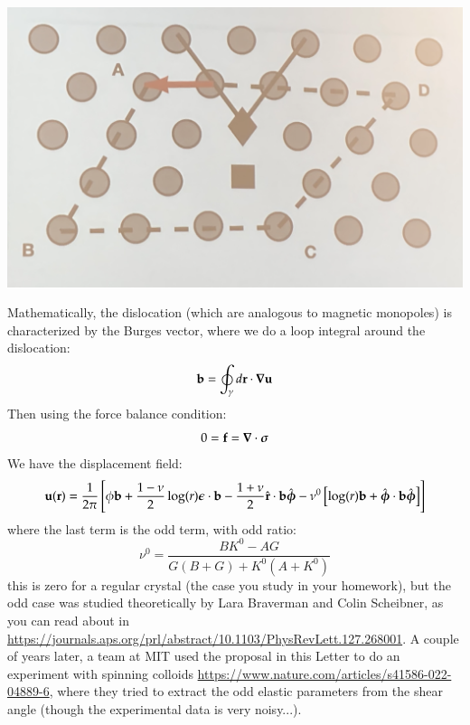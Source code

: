 \begin{center}
    \includegraphics[scale=0.3]{Lectures/Images/lec7-dislocationatoms.png}
\end{center}
Mathematically, the dislocation (which are analogous to magnetic monopoles) is characterized by the Burges vector, where we do a loop integral around the dislocation:
\begin{equation}
    \v{b} = \oint_{\gamma}d\v{r} \cdot \nabla \v{u}
\end{equation}
Then using the force balance condition:
\begin{equation}
    0 = \v{f} = \nabla \cdot \gv{\sigma}
\end{equation}
We have the displacement field:
\begin{equation}
    \mathbf{u}(\mathbf{r}) = \frac{1}{2\pi}\left[\phi \mathbf{b} + \frac{1-\nu}{2}\log(r)\mbox{\boldmath$ \epsilon $} \cdot \mathbf{b} - \frac{1+\nu}{2}\hat{\mathbf{r}} \cdot \mathbf{b}\hat{\mbox{\boldmath$ \phi $}} - \nu^0\left[\log(r)\mathbf{b} + \hat{\mbox{\boldmath$ \phi $}}\cdot \mathbf{b}\hat{\mbox{\boldmath$ \phi $}}\right]\right]
\end{equation}
where the last term is the odd term, with odd ratio:
\begin{equation}
    \nu^0 = \frac{BK^0 - AG}{G(B + G) + K^0(A+K^0)}
\end{equation}
this is zero for a regular crystal (the case you study in your homework), but the odd case was studied theoretically by Lara Braverman and Colin Scheibner, as you can read about in \url{https://journals.aps.org/prl/abstract/10.1103/PhysRevLett.127.268001}. A couple of years later, a team at MIT used the proposal in this Letter to do an experiment with spinning colloids \url{https://www.nature.com/articles/s41586-022-04889-6}, where they tried to extract the odd elastic parameters from the shear angle (though the experimental data is very noisy...).

